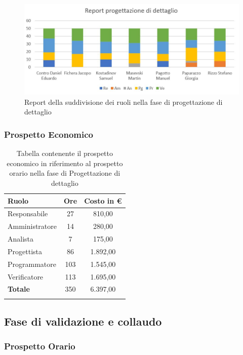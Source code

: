 \documentclass[../piano_di_progetto.tex]{subfiles}
\begin{document}
\begin{figure}[H]
\centering
\includegraphics[width=12cm]{img/report_prog_dett}
\caption{Report della suddivisione dei ruoli nella fase di progettazione di dettaglio}
\end{figure}

\newpage

\subsubsection{Prospetto Economico}

\begin{center}
	\begin{longtable}{|l|c|c|}
		\hline
		\rowcolor{lightgray}
		\textbf{Ruolo} & \textbf{Ore} & \textbf{Costo in €}\\
		\hline
		Responsabile & 27 & 810,00\\
		Amministratore & 14 & 280,00\\
		Analista & 7 & 175,00\\
		Progettista & 86 & 1.892,00\\
		Programmatore & 103 & 1.545,00\\
		Verificatore & 113 & 1.695,00\\
		\hline
		\textbf{Totale} & 350 & 6.397,00\\
		\hline
		\rowcolor{white}
		\caption{Tabella contenente il prospetto economico in riferimento al prospetto orario nella fase di Progettazione di dettaglio}
	\end{longtable}
\end{center}

\subsection{ Fase di validazione e collaudo}%
\label{sub:fase_valid_collaudo}
\subsubsection{Prospetto Orario}
\end{document}
